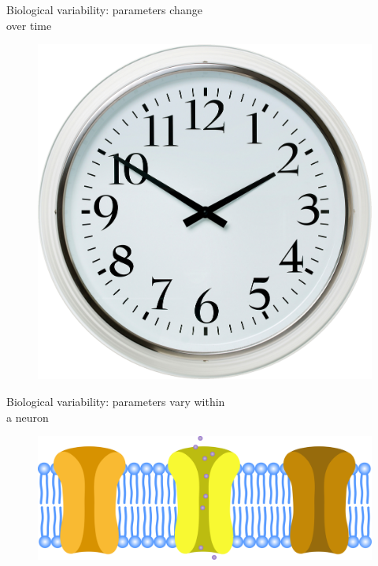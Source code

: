 \documentclass[presentation]{beamer}
\begin{document}
\begin{frame}{Biological variability: parameters change \\ over time }
  \begin{figure}
    \includegraphics[height=0.7\textheight]{time.png}

  \end{figure}

\end{frame}



\begin{frame}{Biological variability: parameters vary within \\ a neuron}
  \begin{figure}
    \includegraphics[width=1\textwidth]{channels_diverse.png}

  \end{figure}

\end{frame}
\end{document}
